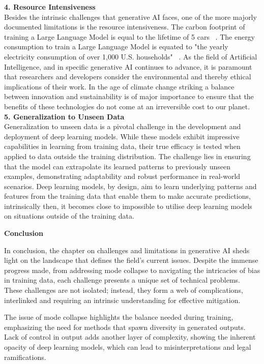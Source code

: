 \documentclass[a4paper,12pt]{report}
\begin{document}
\textbf{4. Resource Intensiveness} ~\cite{LLMC}\\
Besides the intrinsic challenges that generative AI faces, one of the more majorly documented limitations is the resource intensiveness. The carbon footprint of training a Large Language Model is equal to the lifetime of 5 cars ~\cite{CarbonFootprint}. The energy consumption to train a Large Language Model is equated to "the yearly electricity consumption of over 1,000 U.S. households" ~\cite{Interview}. As the field of Artificial Intelligence, and in specific generative AI continues to advance, it is paramount that researchers and developers consider the environmental and thereby ethical implications of their work. In the age of climate change striking a balance between innovation and sustainability is of major importance to ensure that the benefits of these technologies do not come at an irreversible cost to our planet.\\

\textbf{5. Generalization to Unseen Data} ~\cite{Generalizing}\\
Generalization to unseen data is a pivotal challenge in the development and deployment of deep learning models. While these models exhibit impressive capabilities in learning from training data, their true efficacy is tested when applied to data outside the training distribution. The challenge lies in ensuring that the model can extrapolate its learned patterns to previously unseen examples, demonstrating adaptability and robust performance in real-world scenarios. Deep learning models, by design, aim to learn underlying patterns and features from the training data that enable them to make accurate predictions, intrinsically then, it becomes close to impossible to utilise deep learning models on situations outside of the training data.

\textbf{Conclusion}

In conclusion, the chapter on challenges and limitations in generative AI sheds light on the landscape that defines the field's current issues. Despite the immense progress made, from addressing mode collapse to navigating the intricacies of bias in training data, each challenge presents a unique set of technical problems. These challenges are not isolated; instead, they form a web of complications, interlinked and requiring an intrinsic understanding for effective mitigation.

The issue of mode collapse highlights the balance needed during training, emphasizing the need for methods that spawn diversity in generated outputs. Lack of control in output adds another layer of complexity, showing the inherent opacity of deep learning models, which can lead to misinterpretations and legal ramifications.
\end{document}
